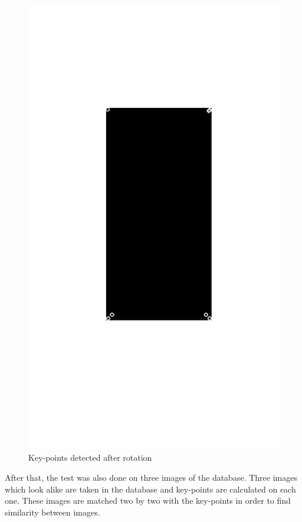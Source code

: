 \documentclass[12pt]{article}
\begin{document}
\begin{figure}[!h]
    \center
    \includegraphics[scale=0.3]{rot1.jpg}
    \caption{Key-points detected after rotation}
    \label{figure:Illustration }
\end{figure}

After that, the test was also done on three images of the database. Three  images which look alike are taken in the database and key-points are calculated on each one. 
These images are matched two by two with the key-points in order to find similarity between images.
\end{document}
